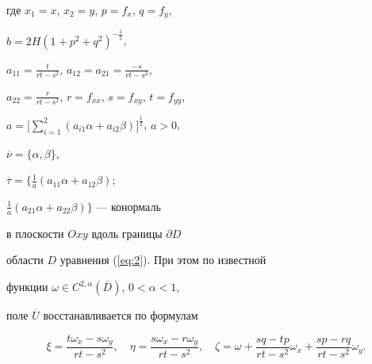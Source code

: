 где $x_1=x$, $x_2=y$, $p=f_x$, $q=f_y$, 


$b=2H (1+p^2+q^2)^{ - \frac{1}{2}}$,


$a_{11}=\frac{t}{rt - s^2}$, $a_{12}=a_{21}=\frac{ - s}{rt - s^2}$,


$a_{22}=\frac{r}{rt - s^2}$, $r=f_{xx}$, $s=f_{xy}$, $t=f_{yy}$,


$a=\Big[ {\sum\limits_{i=1}^2 { ({a_{i1} \alpha+a_{i2} \beta })} }


\Big]^{\frac{1}{2}}$, $a > 0$,


$\overline \nu=\{ {\alpha ,\beta } \}$,


$\overline \tau=\{ \frac{1}{a} (a_{11} \alpha+a_{12} \beta )$;


$\frac{1}{a} (a_{21} \alpha+a_{22} \beta ) \}$ --- конормаль 


в плоскости $Oxy$ вдоль границы $\partial D$ 


области $D$ уравнения (\ref{eq:2}). При этом по известной 


функции $\omega \in C^{2,\alpha } ({\overline D })$, $0 < \alpha < 1$,


поле $\overline U $ восстанавливается по формулам


\begin{equation}\label{eq:7}


\xi=\frac{t\omega_x - s\omega_y }{rt - s^2}, \quad


\eta=\frac{s\omega_x - r\omega_y }{rt - s^2}, \quad


\zeta=\omega+\frac{sq - tp}{rt - s^2}\omega_x+\frac{sp - rq}{rt - s^2}


\omega_y.


\end{equation}





